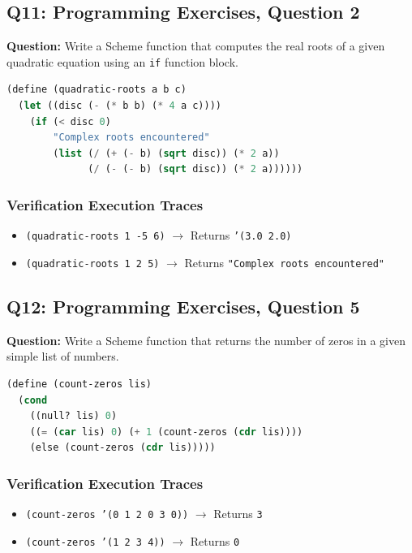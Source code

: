 \documentclass[11pt]{article}
\begin{document}
\subsection{Q11: Programming Exercises, Question 2}
\textbf{Question:} Write a Scheme function that computes the real roots of a given quadratic equation using an \texttt{if} function block.

\begin{lstlisting}[language=Lisp]
(define (quadratic-roots a b c)
  (let ((disc (- (* b b) (* 4 a c))))
    (if (< disc 0)
        "Complex roots encountered"
        (list (/ (+ (- b) (sqrt disc)) (* 2 a))
              (/ (- (- b) (sqrt disc)) (* 2 a))))))
\end{lstlisting}

\subsubsection*{Verification Execution Traces}
\begin{itemize}
    \item \texttt{(quadratic-roots 1 -5 6)} $\rightarrow$ Returns \texttt{'(3.0 2.0)}
    \item \texttt{(quadratic-roots 1 2 5)} $\rightarrow$ Returns \texttt{"Complex roots encountered"}
\end{itemize}

\subsection{Q12: Programming Exercises, Question 5}
\textbf{Question:} Write a Scheme function that returns the number of zeros in a given simple list of numbers.

\begin{lstlisting}[language=Lisp]
(define (count-zeros lis)
  (cond
    ((null? lis) 0)
    ((= (car lis) 0) (+ 1 (count-zeros (cdr lis))))
    (else (count-zeros (cdr lis)))))
\end{lstlisting}

\subsubsection*{Verification Execution Traces}
\begin{itemize}
    \item \texttt{(count-zeros '(0 1 2 0 3 0))} $\rightarrow$ Returns \texttt{3}
    \item \texttt{(count-zeros '(1 2 3 4))} $\rightarrow$ Returns \texttt{0}
\end{itemize}
\end{document}

